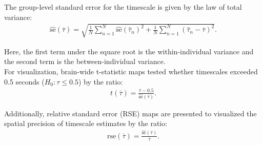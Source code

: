 \documentclass[docs/main.tex]{subfiles}
\begin{document}
\noindent The group-level standard error for the timescale is given by the law of total variance:
\begin{align}
    \widehat{\text{se}}(\bar\tau) = \sqrt{\frac{1}{N} \sum_{n=1}^N \widehat{\text{se}}(\hat\tau_n)^2 + \frac{1}{N} \sum_{n=1}^N (\hat\tau_n - \bar\tau)^2}.
\end{align}

\noindent Here, the first term under the square root is the within-individual variance and the second term is the between-individual variance.\\

For visualization, brain-wide t-statistic maps tested whether timescales exceeded 0.5 seconds ($H_0: \tau \leq 0.5$) by the ratio:
\begin{align}\label{eq:t-ratio}
    t(\bar\tau) = \frac{\bar\tau-0.5}{\widehat{\text{se}}(\bar\tau)}.
\end{align}

\noindent Additionally, relative standard error (RSE) maps are presented to visualized the spatial precision of timescale estimates by the ratio:
\begin{align}
    \text{rse}(\bar\tau) = \frac{\widehat{\text{se}}(\bar\tau)}{\bar\tau}.
\end{align}
\end{document}
